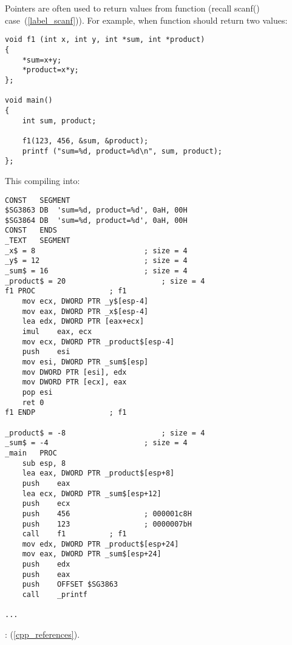 \section{}
\index{\CLanguageElements!\Pointers}
\label{label_pointers}

{Pointers are often used to return values from function (recall scanf() case~(\ref{label_scanf})).}
{For example, when function should return two values:}

\begin{lstlisting}
void f1 (int x, int y, int *sum, int *product)
{
	*sum=x+y;
	*product=x*y;
};

void main()
{
	int sum, product;

	f1(123, 456, &sum, &product);
	printf ("sum=%d, product=%d\n", sum, product);
};
\end{lstlisting}

{This compiling into:}

\begin{lstlisting}[caption=\Optimizing MSVC 2010]
CONST	SEGMENT
$SG3863	DB	'sum=%d, product=%d', 0aH, 00H
$SG3864	DB	'sum=%d, product=%d', 0aH, 00H
CONST	ENDS
_TEXT	SEGMENT
_x$ = 8							; size = 4
_y$ = 12						; size = 4
_sum$ = 16						; size = 4
_product$ = 20						; size = 4
f1 PROC					; f1
	mov	ecx, DWORD PTR _y$[esp-4]
	mov	eax, DWORD PTR _x$[esp-4]
	lea	edx, DWORD PTR [eax+ecx]
	imul	eax, ecx
	mov	ecx, DWORD PTR _product$[esp-4]
	push	esi
	mov	esi, DWORD PTR _sum$[esp]
	mov	DWORD PTR [esi], edx
	mov	DWORD PTR [ecx], eax
	pop	esi
	ret	0
f1 ENDP					; f1

_product$ = -8						; size = 4
_sum$ = -4						; size = 4
_main	PROC
	sub	esp, 8
	lea	eax, DWORD PTR _product$[esp+8]
	push	eax
	lea	ecx, DWORD PTR _sum$[esp+12]
	push	ecx
	push	456					; 000001c8H
	push	123					; 0000007bH
	call	f1			; f1
	mov	edx, DWORD PTR _product$[esp+24]
	mov	eax, DWORD PTR _sum$[esp+24]
	push	edx
	push	eax
	push	OFFSET $SG3863
	call	_printf

...
\end{lstlisting}

: (\ref{cpp_references}).
